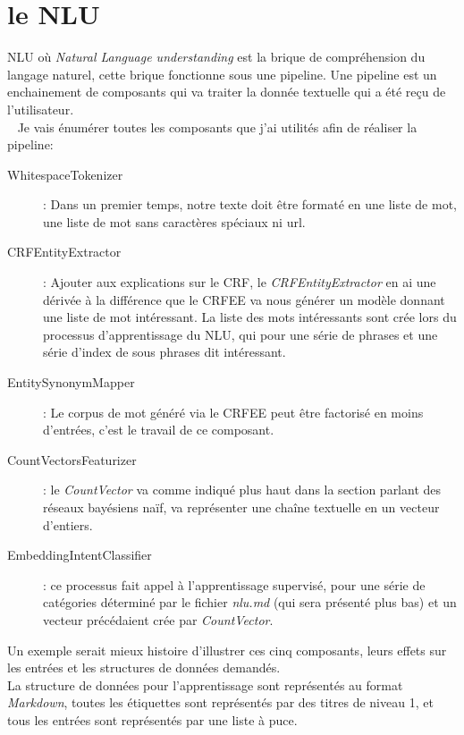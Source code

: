 \section{le NLU}
NLU où \textit{Natural Language understanding} est la brique de compréhension du langage naturel, cette brique fonctionne sous une pipeline. Une pipeline est un enchainement de composants qui va traiter la donnée textuelle qui a été reçu de l'utilisateur.\\
\ \linebreak
Je vais énumérer toutes les composants que j'ai utilités afin de réaliser la pipeline:
\begin{description}
\item[WhitespaceTokenizer]: Dans un premier temps, notre texte doit être formaté en une liste de mot, une liste de mot sans caractères spéciaux ni url.
\item[CRFEntityExtractor]: Ajouter aux explications sur le CRF, le \textit{CRFEntityExtractor} en ai une dérivée à la différence que le CRFEE va nous générer un modèle donnant une liste de mot intéressant. La liste des mots intéressants sont crée lors du processus d'apprentissage du NLU, qui pour une série de phrases et une série d'index de sous phrases dit intéressant.
\item[EntitySynonymMapper]: Le corpus de mot généré via le CRFEE peut être factorisé en moins d'entrées, c'est le travail de ce composant.
\item[CountVectorsFeaturizer]: le \textit{CountVector} va comme indiqué plus haut dans la section parlant des réseaux bayésiens naïf, va représenter une chaîne textuelle en un vecteur d'entiers.
\item[EmbeddingIntentClassifier]: ce processus fait appel à l'apprentissage supervisé, pour une série de catégories déterminé par le fichier \textit{nlu.md} (qui sera présenté plus bas) et un vecteur précédaient crée par \textit{CountVector}.
\end{description}

\pagebreak

Un exemple serait mieux histoire d'illustrer ces cinq composants, leurs effets sur les entrées et les structures de données demandés.\\
La structure de données pour l'apprentissage sont représentés au format \textit{Markdown}, toutes les étiquettes sont représentés par des titres de niveau 1, et tous les entrées sont représentés par une liste à puce.\\

